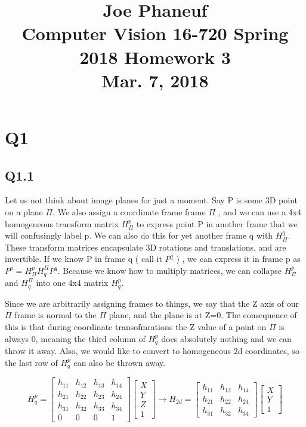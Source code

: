 \documentclass[12pt]{article}
\begin{document}
\title{Joe Phaneuf \\ Computer Vision 16-720 Spring 2018 Homework 3 \\ Mar. 7, 2018 }
\date{}
\author{}
\maketitle

\newpage


\section{Q1}
\subsection{Q1.1}
Let us not think about image planes for just a moment. Say P is some 3D point on a plane $\Pi$. We also assign a coordinate frame frame $\Pi$ , and we can use a 4x4 homogeneous transform matrix $H_{\Pi}^{p}$ to express point P in another frame that we will confusingly label p. We can also do this for yet another frame q with $H_{\Pi}^{q}$. These transform matrices encapsulate 3D rotations and translations, and are invertible. If we know P in frame q ( call it $P^{q}$ ) , we can express it in frame p as $P^{p} = H_{\Pi}^{p} H_{q}^{\Pi} P^{q}$. Because we know how to multiply matrices, we can collapse $H_{\Pi}^{p}$ and  $H_{q}^{\Pi}$ into one 4x4 matrix $H_{q}^{p}$.

Since we are arbitrarily assigning frames to things, we say that the Z axis of our $\Pi$ frame is normal to the $\Pi$ plane, and the plane is at Z=0. The consequence of this is that during coordinate transofmrations the Z value of a point on $\Pi$ is always 0, meaning the third column of $H_{q}^{p}$ does absolutely nothing and we can throw it away. Also, we would like to convert to homogeneous 2d coordinates, so the last row of $H_{q}^{p}$ can also be thrown away.

$$
H_{q}^{p}=
\begin{bmatrix}
h_{11} & h_{12} & h_{13} & h_{14} \\
h_{21} & h_{22} & h_{23} & h_{24} \\
h_{31} & h_{32} & h_{33} & h_{34} \\
0 & 0 & 0 & 1
\end{bmatrix}
\begin{bmatrix}
X \\ Y \\ Z \\ 1
\end{bmatrix}
\rightarrow
H_{2d}=
\begin{bmatrix}
h_{11} & h_{12} & h_{14} \\
h_{21} & h_{22} & h_{24} \\
h_{31} & h_{32} & h_{34} 
\end{bmatrix}
\begin{bmatrix}
X \\ Y  \\ 1
\end{bmatrix}
$$
\end{document}
